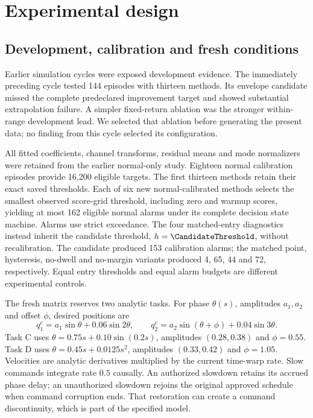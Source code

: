 \section{Experimental design}
\subsection{Development, calibration and fresh conditions}
Earlier simulation cycles were exposed development evidence. The immediately preceding cycle tested 144 episodes with thirteen methods. Its envelope candidate missed the complete predeclared improvement target and showed substantial extrapolation failure. A simpler fixed-return ablation was the stronger within-range development lead. We selected that ablation before generating the present data; no finding from this cycle selected its configuration.

All fitted coefficients, channel transforms, residual means and mode normalizers were retained from the earlier normal-only study. Eighteen normal calibration episodes provide 16,200 eligible targets. The first thirteen methods retain their exact saved thresholds. Each of six new normal-calibrated methods selects the smallest observed score-grid threshold, including zero and warmup scores, yielding at most 162 eligible normal alarms under its complete decision state machine. Alarms use strict exceedance. The four matched-entry diagnostics instead inherit the candidate threshold, $h=\CandidateThreshold$, without recalibration. The candidate produced 153 calibration alarms; the matched point, hysteresis, no-dwell and no-margin variants produced 4, 65, 44 and 72, respectively. Equal entry thresholds and equal alarm budgets are different experimental controls.

The fresh matrix reserves two analytic tasks. For phase $\theta(s)$, amplitudes $a_1,a_2$ and offset $\phi$, desired positions are
\begin{equation}
 q_1^c=a_1\sin\theta+0.06\sin2\theta,\qquad
 q_2^c=a_2\sin(\theta+\phi)+0.04\sin3\theta.
\end{equation}
Task C uses $\theta=0.75s+0.10\sin(0.2s)$, amplitudes $(0.28,0.38)$ and $\phi=0.55$. Task D uses $\theta=0.45s+0.0125s^2$, amplitudes $(0.33,0.42)$ and $\phi=1.05$. Velocities are analytic derivatives multiplied by the current time-warp rate. Slow commands integrate rate $0.5$ causally. An authorized slowdown retains its accrued phase delay; an unauthorized slowdown rejoins the original approved schedule when command corruption ends. That restoration can create a command discontinuity, which is part of the specified model.

